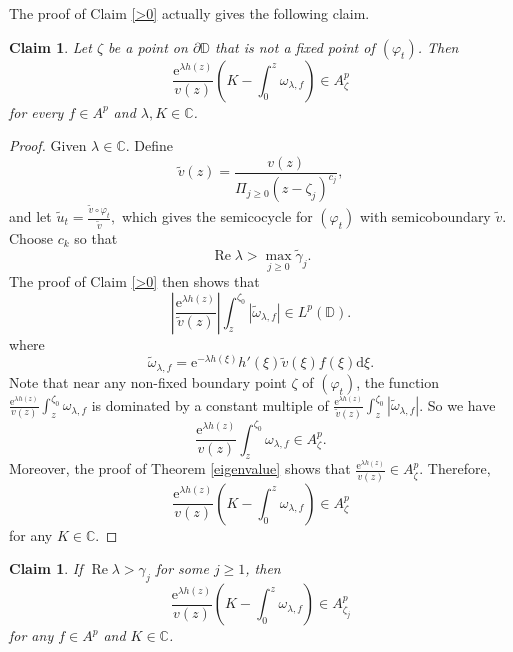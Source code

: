\documentclass{amsart}
\theoremstyle{proclaim}
\newtheorem{claim}[theorem]{Claim}
\theoremstyle{fancyproclaim}
\theoremstyle{definition}
\theoremstyle{fancystatement}
\numberwithin{equation}{section}
\begin{document}
The proof of Claim \ref{>0} actually gives the following claim. 

\begin{claim}\label{others}
Let $\zeta$ be a point on $\partial \mathbb{D}$ that is not a fixed point of $(\varphi_t)$. Then
$$\frac{ \mathrm{e}^{\lambda h(z)}}{v(z)}\left(K-\int_0^{z}\omega_{\lambda,f}\right)\in A^p_{\zeta}$$
for every $f\in A^p$ and $\lambda, K\in\mathbb{C}$. 
\end{claim}

\begin{proof}
Given $\lambda\in\mathbb{C}$. Define
$$\tilde{v}(z)=\frac{v(z)}{\Pi_{j\geq0}(z-\zeta_j)^{c_j}},$$
and let $\tilde{u}_t=\frac{\tilde{v}\circ\varphi_t}{\tilde{v}},$
which gives the semicocycle for $(\varphi_t)$ with semicoboundary $\tilde{v}$.
Choose $c_k$ so that 
$$\operatorname{Re}\lambda>\max_{j\geq0}\tilde{\gamma}_j.$$
The proof of Claim \ref{>0} then shows that 
$$\left|\frac{ \mathrm{e}^{\lambda h(z)}}{\tilde{v}(z)}\right|\int_z^{\zeta_0}|\tilde{\omega}_{\lambda,f}|\in L^p(\mathbb{D}).$$
where
$$\tilde{\omega}_{\lambda,f}=\mathrm{e}^{-\lambda h(\xi)}h'(\xi)\tilde{v}(\xi)f(\xi) \mathrm{d}\xi.$$
Note that near any non-fixed boundary point $\zeta$ of  $(\varphi_t)$, the function $\frac{ \mathrm{e}^{\lambda h(z)}}{v(z)}\int_z^{\zeta_0}\omega_{\lambda,f}$ is dominated by a constant multiple of $\frac{ \mathrm{e}^{\lambda h(z)}}{\tilde{v}(z)}\int_z^{\zeta_0}|\tilde{\omega}_{\lambda,f}|$. So we have
$$\frac{ \mathrm{e}^{\lambda h(z)}}{v(z)}\int_z^{\zeta_0}\omega_{\lambda,f}\in A^p_\zeta.$$
Moreover, the proof of Theorem \ref{eigenvalue} shows that $\frac{ \mathrm{e}^{\lambda h(z)}}{v(z)}\in A^p_\zeta.$ Therefore, 
 $$\frac{ \mathrm{e}^{\lambda h(z)}}{v(z)}\left(K-\int_0^{z}\omega_{\lambda,f}\right)\in A^p_{\zeta}$$
for any $K\in\mathbb{C}$. 
\end{proof}



\begin{claim}\label{>j}
If $ \operatorname{Re}\lambda>\gamma_j$ for some $j\geq 1$, then
$$\frac{ \mathrm{e}^{\lambda h(z)}}{v(z)}\left(K-\int_0^{z}\omega_{\lambda,f}\right)\in A^p_{\zeta_j}$$
for any $f\in A^p$ and $K\in\mathbb{C}$. 
\end{claim}
\end{document}
